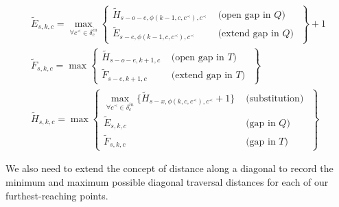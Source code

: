 \documentclass[10pt]{article}         %
\begin{document}
\begin{equation}
\begin{array}{lll}
\widetilde{E}_{s, k, c}=\max_{\forall c^\prec \in \delta_c^{in}}  \left\{\begin{array}{ll}
\widetilde{H}_{s-o-e, \phi(k-1,c,c^\prec), c^\prec} & \text { (open gap in $Q$) } \\
\widetilde{E}_{s-e, \phi(k-1,c,c^\prec), c^\prec} & \text { (extend gap in $Q$) }
\end{array}\right\}+1 \\
\widetilde{F}_{s, k, c}=\max \left\{\begin{array}{ll}
\widetilde{H}_{s-o-e, k+1, c} & \text { (open gap in $T$) } \\
\widetilde{F}_{s-e, k+1, c} & \text { (extend gap in $T$) }
\end{array}\right\} \\
\widetilde{H}_{s, k, c}=\max \left\{\begin{array}{ll}
\max_{\forall c^\prec \in \delta_c^{in}}\{\widetilde{H}_{s-x, \phi(k,c,c^\prec), c^\prec}+1 \} & \text { (substitution) } \\
\widetilde{E}_{s, k, c} & \text { (gap in $Q$) } \\
\widetilde{F}_{s, k, c} & \text { (gap in $T$) }
\end{array}\right\}
\end{array}
\label{eq:wfpoa}
\end{equation}

We also need to extend the concept of distance along a diagonal to record the minimum and maximum possible diagonal traversal distances for each of our furthest-reaching points.
\end{document}
